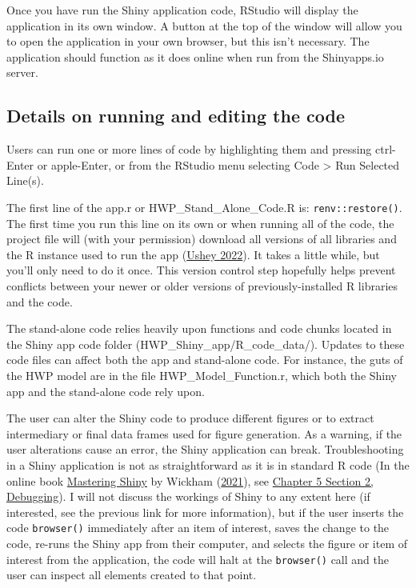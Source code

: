 \documentclass[
  openany]{book}
\begin{document}
Once you have run the Shiny application code, RStudio will display the
application in its own window. A button at the top of the window will
allow you to open the application in your own browser, but this isn't
necessary. The application should function as it does online when run
from the Shinyapps.io server.

\hypertarget{dnld-shiny-details}{%
\subsection{Details on running and editing the
code}\label{dnld-shiny-details}}

Users can run one or more lines of code by highlighting them and
pressing ctrl-Enter or apple-Enter, or from the RStudio menu selecting
Code \textgreater{} Run Selected Line(s).

The first line of the app.r or HWP\_Stand\_Alone\_Code.R is:
\texttt{renv::restore()}. The first time you run this line on its own or
when running all of the code, the project file will (with your
permission) download all versions of all libraries and the R instance
used to run the app (\protect\hyperlink{ref-R-renv}{Ushey 2022}). It
takes a little while, but you'll only need to do it once. This version
control step hopefully helps prevent conflicts between your newer or
older versions of previously-installed R libraries and the code.

The stand-alone code relies heavily upon functions and code chunks
located in the Shiny app code folder (HWP\_Shiny\_app/R\_code\_data/).
Updates to these code files can affect both the app and stand-alone
code. For instance, the guts of the HWP model are in the file
HWP\_Model\_Function.r, which both the Shiny app and the stand-alone
code rely upon.

The user can alter the Shiny code to produce different figures or to
extract intermediary or final data frames used for figure generation. As
a warning, if the user alterations cause an error, the Shiny application
can break. Troubleshooting in a Shiny application is not as
straightforward as it is in standard R code (In the online book
\href{https://mastering-shiny.org/index.html}{Mastering Shiny} by
Wickham (\protect\hyperlink{ref-wickham2021}{2021}), see
\href{https://mastering-shiny.org/action-workflow.html}{Chapter 5
Section 2, Debugging}). I will not discuss the workings of Shiny to any
extent here (if interested, see the previous link for more information),
but if the user inserts the code \texttt{browser()} immediately after an
item of interest, saves the change to the code, re-runs the Shiny app
from their computer, and selects the figure or item of interest from the
application, the code will halt at the \texttt{browser()} call and the
user can inspect all elements created to that point.
\end{document}
